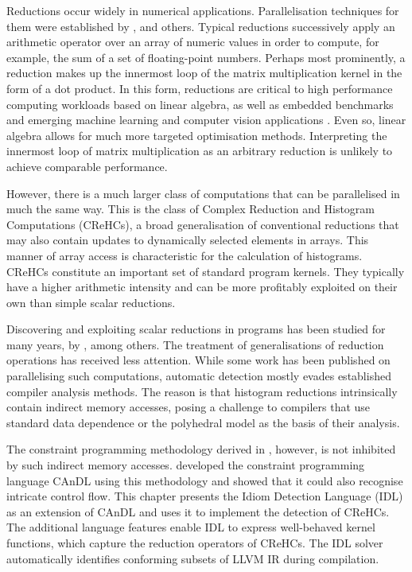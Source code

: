     Reductions occur widely in numerical applications.
    Parallelisation techniques for them were established by
    \citet{rauchwerger1999lrpd,yu2006adaptive,Jradi2017fast}, and others.
    Typical reductions successively apply an arithmetic operator over an
    array of numeric values in order to compute, for example, the sum of a set
    of floating-point numbers.
    Perhaps most prominently, a reduction makes up the innermost loop of the
    matrix multiplication kernel in the form of a dot product.
    In this form, reductions are critical to high performance computing
    workloads based on linear algebra, as well as embedded benchmarks and
    emerging machine learning and computer vision applications
    \citep{Reddy2016Reduction}.
    Even so, linear algebra allows for much more targeted optimisation methods.
    Interpreting the innermost loop of matrix multiplication as an arbitrary
    reduction is unlikely to achieve comparable performance.

    However, there is a much larger class of computations that can be
    parallelised in much the same way.
    This is the class of Complex Reduction and Histogram Computations (CReHCs),
    a broad generalisation of conventional reductions that may also contain
    updates to dynamically selected elements in arrays.
    This manner of array access is characteristic for the calculation of
    histograms.
    CReHCs constitute an important set of standard program kernels.
    They typically have a higher arithmetic intensity and can be more profitably
    exploited on their own than simple scalar reductions.

    Discovering and exploiting scalar reductions in programs has been
    studied for many years, by \citet{pottenger1995idiom}, among others.
    The treatment of generalisations of reduction operations has received less
    attention.
    While some work has been published on parallelising such computations,
    automatic detection mostly evades established compiler analysis methods.
    The reason is that histogram reductions intrinsically contain indirect
    memory accesses, posing a challenge to compilers that use
    standard data dependence \citep{kuck1981dependence} or the polyhedral model
    \citep{benabderrahmane2010polyhedral} as the basis of their analysis.

    The constraint programming methodology derived in ,
    however, is not inhibited by such indirect memory accesses.
     developed the constraint programming language CAnDL
    using this methodology and showed that it could also recognise intricate
    control flow.
    This chapter presents the Idiom Detection Language (IDL) as an extension
    of CAnDL and uses it to implement the detection of CReHCs.
    The additional language features enable IDL to express well-behaved
    kernel functions, which capture the reduction operators of CReHCs.
    The IDL solver automatically identifies conforming subsets of LLVM IR during
    compilation.

